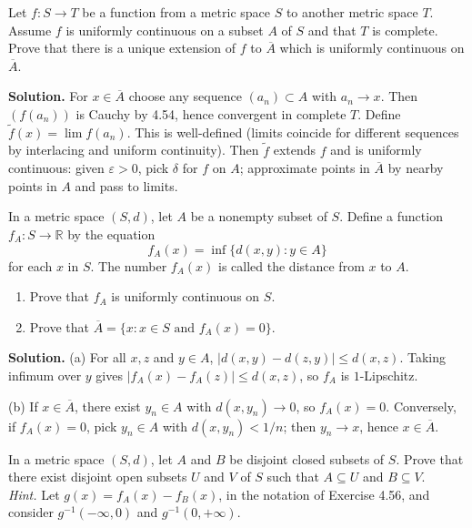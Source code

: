 \begin{problembox}
Let $f : S \to T$ be a function from a metric space $S$ to another metric space $T$. Assume $f$ is uniformly continuous on a subset $A$ of $S$ and that $T$ is complete. Prove that there is a unique extension of $f$ to $\overline{A}$ which is uniformly continuous on $\overline{A}$.
\end{problembox}

\noindent\textbf{Solution.}
For $x\in\overline{A}$ choose any sequence $(a_n)\subset A$ with $a_n\to x$. Then $(f(a_n))$ is Cauchy by 4.54, hence convergent in complete $T$. Define $\tilde f(x)=\lim f(a_n)$. This is well-defined (limits coincide for different sequences by interlacing and uniform continuity). Then $\tilde f$ extends $f$ and is uniformly continuous: given $\varepsilon>0$, pick $\delta$ for $f$ on $A$; approximate points in $\overline{A}$ by nearby points in $A$ and pass to limits.
\medskip

\begin{problembox}
In a metric space $(S, d)$, let $A$ be a nonempty subset of $S$. Define a function $f_A : S \to \mathbb{R}$ by the equation
\[f_A(x) = \inf \{d(x, y) : y \in A\}\]
for each $x$ in $S$. The number $f_A(x)$ is called the distance from $x$ to $A$.
\begin{enumerate}[label=(\alph*)]
\item Prove that $f_A$ is uniformly continuous on $S$.
\item Prove that $\overline{A} = \{x : x \in S \text{ and } f_A(x) = 0\}$.
\end{enumerate}
\end{problembox}

\noindent\textbf{Solution.}
(a) For all $x,z$ and $y\in A$, $|d(x,y)-d(z,y)|\le d(x,z)$. Taking infimum over $y$ gives $|f_A(x)-f_A(z)|\le d(x,z)$, so $f_A$ is $1$-Lipschitz.

(b) If $x\in\overline{A}$, there exist $y_n\in A$ with $d(x,y_n)\to 0$, so $f_A(x)=0$. Conversely, if $f_A(x)=0$, pick $y_n\in A$ with $d(x,y_n)<1/n$; then $y_n\to x$, hence $x\in\overline{A}$.
\medskip

\begin{problembox}
In a metric space $(S, d)$, let $A$ and $B$ be disjoint closed subsets of $S$. Prove that there exist disjoint open subsets $U$ and $V$ of $S$ such that $A \subseteq U$ and $B \subseteq V$. \\
\textit{Hint.} Let $g(x) = f_A(x) - f_B(x)$, in the notation of Exercise 4.56, and consider $g^{-1}(-\infty, 0)$ and $g^{-1}(0, +\infty)$.
\end{problembox}

